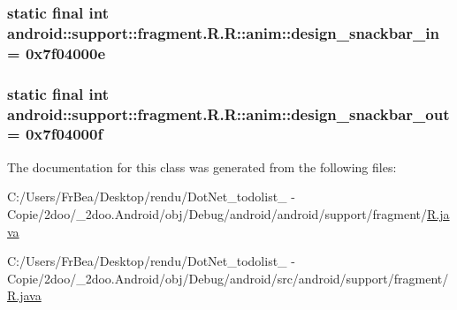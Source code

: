 \hypertarget{classandroid_1_1support_1_1fragment_1_1_r_1_1anim_621e1d675dead7dc09a6215c11300062}{
\subsubsection[{design\_\-snackbar\_\-in}]{\setlength{\rightskip}{0pt plus 5cm}static final int android::support::fragment.R.R::anim::design\_\-snackbar\_\-in = 0x7f04000e}}
\label{classandroid_1_1support_1_1fragment_1_1_r_1_1anim_621e1d675dead7dc09a6215c11300062}


\hypertarget{classandroid_1_1support_1_1fragment_1_1_r_1_1anim_248c9efb4f955e21c8da0dd6eaedee48}{
\subsubsection[{design\_\-snackbar\_\-out}]{\setlength{\rightskip}{0pt plus 5cm}static final int android::support::fragment.R.R::anim::design\_\-snackbar\_\-out = 0x7f04000f}}
\label{classandroid_1_1support_1_1fragment_1_1_r_1_1anim_248c9efb4f955e21c8da0dd6eaedee48}




The documentation for this class was generated from the following files:\begin{CompactItemize}
\item 
C:/Users/FrBea/Desktop/rendu/DotNet\_\-todolist\_ - Copie/2doo/\_\-2doo.Android/obj/Debug/android/android/support/fragment/\hyperlink{android_2support_2fragment_2_r_8java}{R.java}\item 
C:/Users/FrBea/Desktop/rendu/DotNet\_\-todolist\_ - Copie/2doo/\_\-2doo.Android/obj/Debug/android/src/android/support/fragment/\hyperlink{src_2android_2support_2fragment_2_r_8java}{R.java}\end{CompactItemize}
